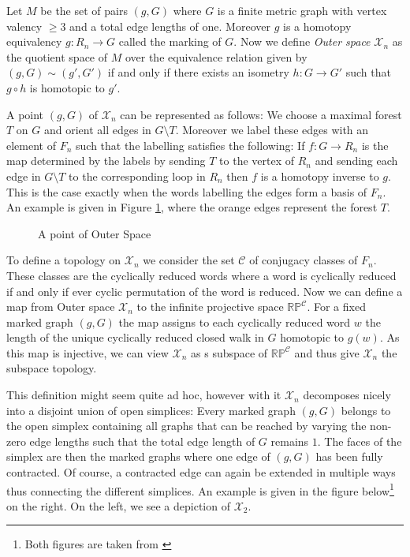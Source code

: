 \begin{definition}
Let $M$ be the set of pairs $(g,G)$ where $G$ is a finite metric graph with vertex valency $\geq 3$ and a total edge lengths of one.
Moreover $g$ is a homotopy equivalency $g: R_{n} \to G$ called the marking of $G$.
Now we define \emph{Outer space} $\mathcal{X}_{n}$ as the quotient space of $M$ over the equivalence relation given by $(g,G) \sim (g',G')$ if and only if 
there exists an isometry $h: G \to G'$ such that $g \circ h$ is homotopic to $g'$.
\end{definition}

A point $(g,G)$ of $\mathcal{X}_{n}$ can be represented as follows:
We choose a maximal forest $T$ on $G$ and orient all edges in $G \setminus T$.
Moreover we label these edges with an element of $F_{n}$ such that the labelling satisfies the following:
If $f: G \to R_{n}$ is the map determined by the labels by sending $T$ to the vertex of $R_{n}$ and sending
each edge in $G \setminus T$ to the corresponding loop in $R_{n}$ then $f$ is a homotopy inverse to $g$.
This is the case exactly when the words labelling the edges form a basis of $F_{n}$.
An example is given in Figure \ref{fig:pointOfXn}, where the orange edges represent the forest $T$.

\begin{figure}[ht]
	\centering
	\caption[skip=0pt]{A point of Outer Space}
	\label{fig:pointOfXn}
\end{figure}

To define a topology on $\mathcal{X}_{n}$ we consider the set $\mathcal{C}$ of conjugacy classes of $F_{n}$.
These classes are the cyclically reduced words where a word is cyclically reduced if and only if ever cyclic permutation of the word is reduced.
Now we can define a map from Outer space $\mathcal{X}_{n}$ to the infinite projective space $\mathbb{RP}^{\mathcal{C}}$.
For a fixed marked graph $(g,G)$ the map assigns to each cyclically reduced word $w$ the length
of the unique cyclically reduced closed walk in $G$ homotopic to $g(w)$.
As this map is injective, we can view $\mathcal{X}_{n}$ as s subspace of $\mathbb{RP}^{\mathcal{C}}$ and thus
give $\mathcal{X}_{n}$ the subspace topology.

This definition might seem quite ad hoc, however with it $\mathcal{X}_{n}$ decomposes nicely into
a disjoint union of open simplices: Every marked graph $(g,G)$ belongs to the open simplex
containing all graphs that can be reached by varying the non-zero edge lengths such that
the total edge length of $G$ remains $1$. The faces of the simplex are then the marked graphs where one edge of $(g,G)$
has been fully contracted. Of course, a contracted edge can again be extended in multiple ways thus connecting
the different simplices. An example is given in the figure below\footnote{Both figures are taken from \cite{vogtmann02}} on the right.
On the left, we see a depiction of $\mathcal{X}_{2}$.

